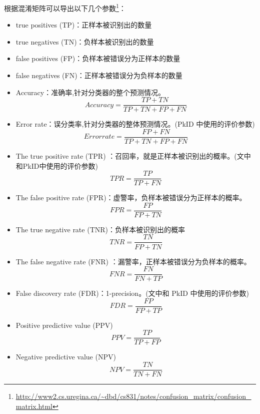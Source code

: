 \documentclass[12pt]{article}
\begin{document}
根据混淆矩阵可以导出以下几个参数\footnote{\url{http://www2.cs.uregina.ca/~dbd/cs831/notes/confusion_matrix/confusion_matrix.html}}：
\begin{itemize}
    \item true positives (TP)：正样本被识别出的数量
    \item true negatives (TN)：负样本被识别出的数量
    \item false positives (FP)：负样本被错误分为正样本的数量
    \item false negatives (FN)：正样本被错误分为负样本的数量\newline
    
    \item Accuracy：准确率,针对分类器的整个预测情况。
        \begin{displaymath}
            Accuracy=\frac{TP+TN}{TP+TN+FP+FN}
        \end{displaymath}
    \item {\color{red}Error rate：误分类率,针对分类器的整体预测情况。}(PkID 中使用的评价参数)
        \begin{displaymath}
            Error rate=\frac{FP+FN}{TP+TN+FP+FN}
        \end{displaymath}
    \item {\color{blue}The true positive rate (TPR) ：召回率，就是正样本被识别出的概率。}(文中和PkID中使用的评价参数)
        \begin{displaymath}
            TPR=\frac{TP}{TP+FN}
        \end{displaymath}
     \item The false positive rate (FPR)：虚警率，负样本被错误分为正样本的概率。
        \begin{displaymath}
            FPR=\frac{FP}{FP+TN}
        \end{displaymath}
    \item The true negative rate (TNR)：负样本被识别出的概率
        \begin{displaymath}
            TNR=\frac{TN}{FP+TN}
        \end{displaymath}

    \item The false negative rate (FNR) ：漏警率，正样本被错误分为负样本的概率。
        \begin{displaymath}
            FNR=\frac{FN}{FN+TP}
        \end{displaymath}
    \item {\color{blue}False discovery rate (FDR)：1-precision。}(文中和 PkID 中使用的评价参数)
        \begin{displaymath}
            FDR=\frac{FP}{FP+TP}
        \end{displaymath}
    \item Positive predictive value (PPV)
        \begin{displaymath}
            PPV=\frac{TP}{TP+FP}
        \end{displaymath}
    \item Negative predictive value (NPV)
        \begin{displaymath}
            NPV=\frac{TN}{TN+FN}
        \end{displaymath}
    

\end{itemize}
\end{document}
